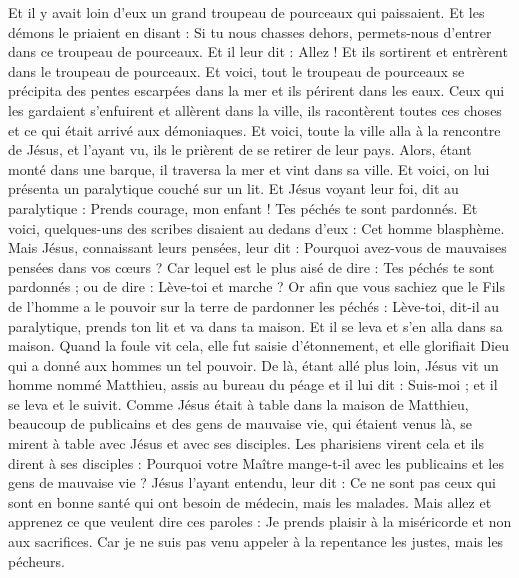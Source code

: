 \begin{multicols}{2}
Et il y avait loin d'eux un grand troupeau de pourceaux qui paissaient.
Et les démons le priaient en disant : Si tu nous chasses dehors, permets-nous d'entrer dans ce troupeau de pourceaux.
Et il leur dit : Allez ! Et ils sortirent et entrèrent dans le troupeau de pourceaux. Et voici, tout le troupeau de pourceaux se précipita des pentes escarpées dans la mer et ils périrent dans les eaux.
Ceux qui les gardaient s'enfuirent et allèrent dans la ville, ils racontèrent toutes ces choses et ce qui était arrivé aux démoniaques.
Et voici, toute la ville alla à la rencontre de Jésus, et l'ayant vu, ils le prièrent de se retirer de leur pays.
\VerseOne{}Alors, étant monté dans une barque, il traversa la mer et vint dans sa ville.
Et voici, on lui présenta un paralytique couché sur un lit. Et Jésus voyant leur foi, dit au paralytique : Prends courage, mon enfant ! Tes péchés te sont pardonnés.
Et voici, quelques-uns des scribes disaient au dedans d'eux : Cet homme blasphème.
Mais Jésus, connaissant leurs pensées, leur dit : Pourquoi avez-vous de mauvaises pensées dans vos cœurs ?
Car lequel est le plus aisé de dire : Tes péchés te sont pardonnés ; ou de dire : Lève-toi et marche ?
Or afin que vous sachiez que le Fils de l'homme a le pouvoir sur la terre de pardonner les péchés : Lève-toi, dit-il au paralytique, prends ton lit et va dans ta maison.
Et il se leva et s'en alla dans sa maison.
Quand la foule vit cela, elle fut saisie d'étonnement, et elle glorifiait Dieu qui a donné aux hommes un tel pouvoir.
De là, étant allé plus loin, Jésus vit un homme nommé Matthieu, assis au bureau du péage et il lui dit : Suis-moi ; et il se leva et le suivit.
Comme Jésus était à table dans la maison de Matthieu, beaucoup de publicains et des gens de mauvaise vie, qui étaient venus là, se mirent à table avec Jésus et avec ses disciples.
Les pharisiens virent cela et ils dirent à ses disciples : Pourquoi votre Maître mange-t-il avec les publicains et les gens de mauvaise vie ?
Jésus l'ayant entendu, leur dit : Ce ne sont pas ceux qui sont en bonne santé qui ont besoin de médecin, mais les malades.
Mais allez et apprenez ce que veulent dire ces paroles : Je prends plaisir à la miséricorde et non aux sacrifices. Car je ne suis pas venu appeler à la repentance les justes, mais les pécheurs.

\end{multicols}
